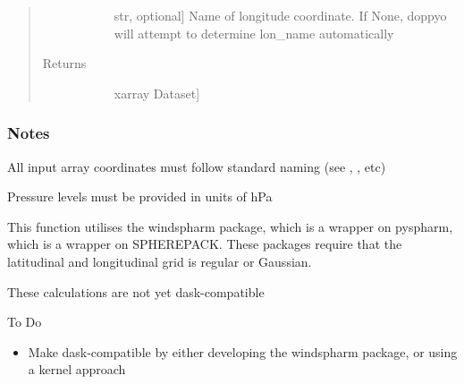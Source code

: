 \documentclass[letterpaper,10pt,english]{sphinxmanual}
\begin{document}
\begin{fulllineitems}
\begin{quote}
\begin{description}
\begin{description}
\item[{}] \leavevmode{[}str, optional{]}
Name of longitude coordinate. If None, doppyo will attempt to determine lon\_name                     automatically

\end{description}

\item[{Returns}] \leavevmode\begin{description}
\item[{}] \leavevmode{[}xarray Dataset{]}

\end{description}

\end{description}\end{quote}
\subsubsection*{Notes}

\begin{DUlineblock}{0em}
\item[] All input array coordinates must follow standard naming (see ,                 , etc)
\item[] Pressure levels must be provided in units of hPa
\item[] This function utilises the windspharm package, which is a wrapper on pyspharm, which is a                 wrapper on SPHEREPACK. These packages require that the latitudinal and longitudinal grid                 is regular or Gaussian.
\item[] These calculations are not yet dask-compatible
\end{DUlineblock}

To Do
\begin{itemize}
\item {} 
Make dask-compatible by either developing the windspharm package, or using a kernel approach


\end{itemize}
\end{fulllineitems}
\end{document}
